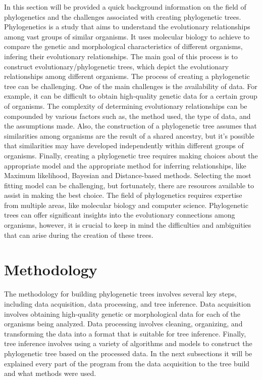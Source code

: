 \documentclass[12pt]{article}
\begin{document}
In this section will be provided a quick background information on the field of phylogenetics and the challenges associated with creating phylogenetic trees.\newline
Phylogenetics is a study that aims to understand the evolutionary relationships among vast groups of similar organisms. It uses molecular biology to achieve to compare the genetic and morphological characteristics of different organisms, infering their evolutionary relationships. The main goal of this process is to construct evolutionary/phylogenetic trees, which depict the evolutionary relationships among different organisms.\newline
The process of creating a phylogenetic tree can be challenging. One of the main challenges is the availability of data. For example, it can be difficult to obtain high-quality genetic data for a certain group of organisms. The complexity of determining evolutionary relationships can be compounded by various factors such as, the method used, the type of data, and the assumptions made. Also, the construction of a phylogenetic tree assumes that similarities among organisms are the result of a shared ancestry, but it's possible that similarities may have developed independently within different groups of organisms.\newline
Finally, creating a phylogenetic tree requires making choices about the appropriate model and the appropriate method for inferring relationships, like Maximum likelihood, Bayesian and Distance-based methods. Selecting the most fitting model can be challenging, but fortunately, there are resources available to assist in making the best choice.\newline
The field of phylogenetics requires expertise from multiple areas, like molecular biology and computer science. Phylogenetic trees can offer significant insights into the evolutionary connections among organisms, however, it is crucial to keep in mind the difficulties and ambiguities that can arise during the creation of these trees.


\section{Methodology}\label{sec:desenvolvimentos}
The methodology for building phylogenetic trees involves several key steps, including data acquisition, data processing, and tree inference. Data acquisition involves obtaining high-quality genetic or morphological data for each of the organisms being analyzed. Data processing involves cleaning, organizing, and transforming the data into a format that is suitable for tree inference. Finally, tree inference involves using a variety of algorithms and models to construct the phylogenetic tree based on the processed data. In the next subsections it will be explained every part of the program from the data acquisition to the tree build and what methods were used.
\end{document}
